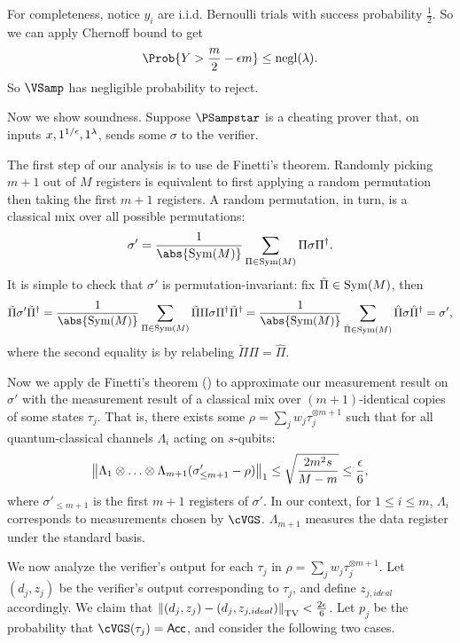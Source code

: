   
\begin{prf} 
	For completeness, notice $y_i$ are i.i.d. Bernoulli trials with success probability $\frac{1}{2}$.
	So we can apply Chernoff bound to get
	$$\Prob{Y>\frac{m}{2}-\eps m}\leq\negl(\lambda).$$
	So $\VSamp$ has negligible probability to reject.
	
	Now we show soundness.
	Suppose $\PSampstar$ is a cheating prover that, on inputs $x, 1^{1/\epsilon}, 1^\lambda$, sends some $\sigma$ to the verifier.

	The first step of our analysis is to use de Finetti's theorem.
	Randomly picking $m+1$ out of $M$ registers is equivalent to first applying a random permutation then taking the first $m+1$ registers.
	A random permutation, in turn, is a classical mix over all possible permutations:
	$$\sigma'=\frac{1}{\abs{\Sym(M)}}\sum_{\Pi\in\Sym(M)}\Pi\sigma\Pi^\dagger.$$
	It is simple to check that $\sigma'$ is permutation-invariant:
	fix $\tilde{\Pi}\in\operatorname{Sym}(M)$, then
	$$\tilde{\Pi}\sigma'\tilde{\Pi}^\dagger
	=\frac{1}{\abs{\Sym(M)}}\sum_{\Pi\in\Sym(M)}\tilde{\Pi}\Pi\sigma\Pi^\dagger\tilde{\Pi}^\dagger
	=\frac{1}{\abs{\Sym(M)}}\sum_{\hat{\Pi}\in\Sym(M)}\hat{\Pi}\sigma\hat{\Pi}^\dagger
	=\sigma',$$
	where the second equality is by relabeling $\tilde{\Pi}\Pi=\hat{\Pi}$.

	Now we apply de Finetti's theorem () to approximate our measurement result on $\sigma'$ with the measurement result of a classical mix over $(m+1)$-identical copies of some states $\tau_j$.
	That is, there exists some $\rho=\sum_j w_j\tau_j^{\otimes m+1}$
	such that for all quantum-classical channels $\Lambda_i$ acting on $s$-qubits:
	$$\left\lVert\Lambda_1\otimes\ldots\otimes\Lambda_{m+1}(\sigma'_{\leq m+1}-\rho)\right\rVert_1
	\leq\sqrt{\frac{2m^2s}{M-m}}
	\leq\frac{\epsilon}{6},$$
	where $\sigma'_{\leq m+1}$ is the first $m+1$ registers of $\sigma'$.
	In our context, for $1\leq i\leq m$, $\Lambda_i$ corresponds to measurements chosen by $\cVGS$.
	$\Lambda_{m+1}$ measures the data register under the standard basis.
	
	We now analyze the verifier's output for each $\tau_j$ in $\rho=\sum_j w_j\tau_j^{\otimes m+1}$. Let $(d_j, z_j)$ be the verifier's output corresponding to $\tau_j$, and define $z_{j, ideal}$ accordingly.
	We claim that $\left\lVert(d_j, z_j)-(d_j, z_{j, ideal})\right\rVert_{\mathrm{TV}}<\frac{2\epsilon}{6}$.
	Let $p_j$ be the probability that $\cVGS(\tau_j)=\Acc$, and consider the following two cases.


\end{prf}
